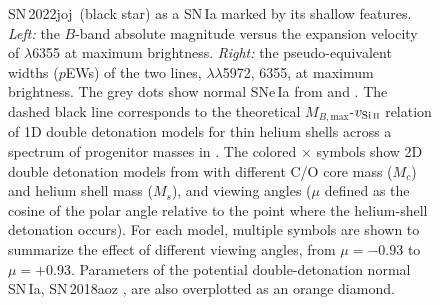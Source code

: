 \documentclass[twocolumn]{aastex631}
\newcommand{\sn}{SN\,2022joj}
\begin{document}
\begin{CJK*}{UTF8}{gbsn}
\begin{figure}
    \caption{\sn\ (black star) as a SN\,Ia marked by its shallow  features. \textit{Left:} the $B$-band absolute magnitude versus the expansion velocity of  $\lambda$6355 at maximum brightness. \textit{Right:} the pseudo-equivalent widths ($p$EWs) of the two  lines,  $\lambda\lambda$5972, 6355, at maximum brightness. The grey dots show normal SNe\,Ia from \citet{Zheng_2018} and \citet{Burrow_2020}. The dashed black line corresponds to the theoretical $M_{B,\mathrm{max}}$-$v_\mathrm{Si\,\textsc{ii}}$ relation of 1D double detonation models for thin helium shells across a spectrum of progenitor masses in \citet{polin_observational_2019}. The colored $\times$ symbols show 2D double detonation models from \citet{Shen_2D_2021} with different C/O core mass ($M_c$) and helium shell mass ($M_s$), and viewing angles ($\mu$ defined as the cosine of the polar angle relative to the point where the helium-shell detonation occurs). For each model, multiple symbols are shown to summarize the effect of different viewing angles, from $\mu = -0.93$ to $\mu=+0.93$. Parameters of the potential double-detonation normal SN\,Ia, SN\,2018aoz \citep{Ni_18aoz_2023}, are also overplotted as an orange diamond.}
    \label{fig:phase_space}
\end{figure}


\end{CJK*}
\end{document}

